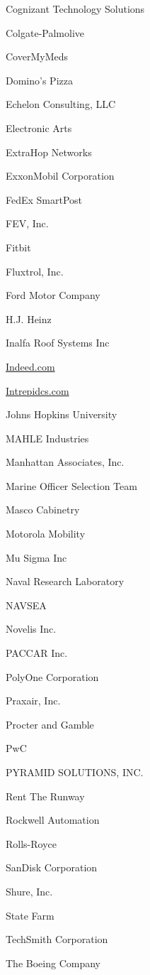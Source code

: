 \documentclass[twoside]{article}
\begin{document}
\begin{center}
\begin{multicols}{5}
\begin{FlushLeft}
\begin{compactitem}
\item Cognizant Technology Solutions
\item Colgate-Palmolive
\item CoverMyMeds
\item Domino's Pizza
\item Echelon Consulting, LLC
\item Electronic Arts
\item ExtraHop Networks
\item ExxonMobil Corporation
\item FedEx SmartPost
\item FEV, Inc.
\item Fitbit
\item Fluxtrol, Inc.
\item Ford Motor Company
\item H.J. Heinz
\item Inalfa Roof Systems Inc
\item \url{Indeed.com}
\item \url{Intrepidcs.com}
\item Johns Hopkins University
\item MAHLE Industries
\item Manhattan Associates, Inc.
\item Marine Officer Selection Team
\item Masco Cabinetry
\item Motorola Mobility
\item Mu Sigma Inc
\item Naval Research Laboratory
\item NAVSEA
\item Novelis Inc.
\item PACCAR Inc.
\item PolyOne Corporation
\item Praxair, Inc.
\item Procter and Gamble
\item PwC
\item PYRAMID SOLUTIONS, INC.
\item Rent The Runway
\item Rockwell Automation
\item Rolls-Royce
\item SanDisk Corporation
\item Shure, Inc.
\item State Farm
\item TechSmith Corporation
\item The Boeing Company

\end{compactitem}
\end{FlushLeft}
\end{multicols}
\end{center}
\end{document}
